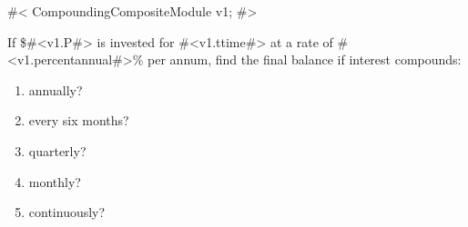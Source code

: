 

 
#<
CompoundingCompositeModule v1;
#>


If \$#<v1.P#> is invested for #<v1.ttime#> at a rate of #<v1.percentannual#>\% per annum, find the final balance if interest compounds: 
\begin{enumerate}
\item
annually?
\item
every six months?
\item
quarterly?
\item
monthly?
\item
continuously?
\end{enumerate}



